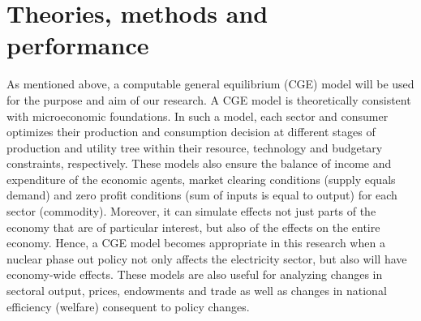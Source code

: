 \section{Theories, methods and performance}
\begin{comment}
	2 Method and performance
		• Feasibility and adequacy of scientific methods  
		• Innovativeness and boldness of methodology  
		• Concrete and realistic work plan  
		• Concrete and realistic plan for scientific deliverables  
		• Coordination of project and research group  
		• Suitability of multi- and interdisciplinary approaches  
		• Ethical considerations
		Clarifications:  
		• Feasibility and adequacy of scientific approaches and methods should receive primary
			consideration
	3 Scientific competence
		• Quality of scientific publications  
		• Ability to carry out the project according to plan 
		• Adequate experience of project management  
		• National and international activities, including projects, networks, assignments,
			commissions of trust, and participating at or arranging workshops or conferences  
		• Strength and competitiveness of the research team  
		Clarifications:  
		• Quality of scientific publications should be assessed taking into account the
			standards within each scientific field 
		• When several researchers collaborate, assessment of scientific competence is made
			both of each researcher separately and of the research group collectively  
		• For starting mobility grants, strength and competitiveness of the research environment
			should be assessed for the home university and the host university 
\end{comment}
As mentioned above, a computable general equilibrium (CGE) model will be used for the purpose and aim of our research. A CGE model is theoretically consistent with microeconomic foundations. In such a model, each sector and consumer optimizes their production and consumption decision at different stages of production and utility tree within their resource, technology and budgetary constraints, respectively. These models also ensure the balance of income and expenditure of the economic agents, market clearing conditions (supply equals demand) and zero profit conditions (sum of inputs is equal to output) for each sector (commodity). Moreover, it can simulate effects not just parts of the economy that are of particular interest, but also of the effects on the entire economy. Hence, a CGE model becomes appropriate in this research when a nuclear phase out policy not only affects the electricity sector, but also will have economy-wide effects. These models are also useful for analyzing changes in sectoral output, prices, endowments and trade as well as changes in national efficiency (welfare) consequent to policy changes.

